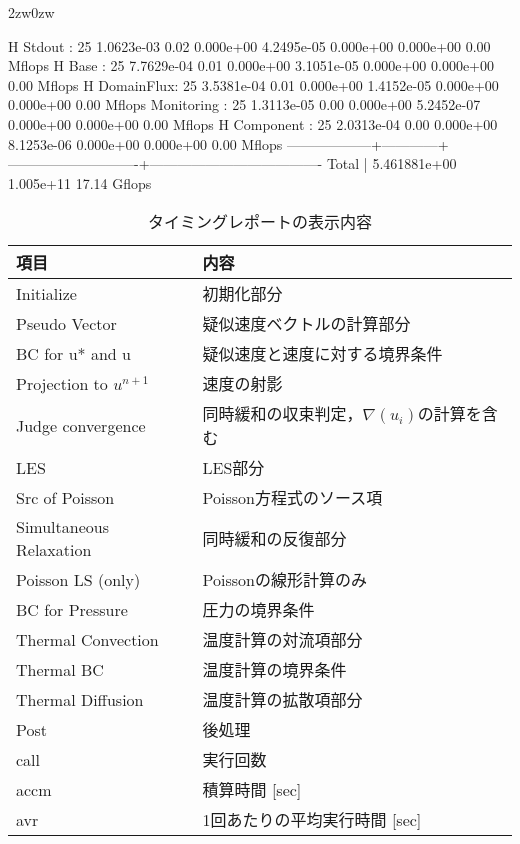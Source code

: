 \begin{indentation}{2zw}{0zw}
{\begin{program}
H Stdout    :  25   1.0623e-03   0.02  0.000e+00  4.2495e-05   0.000e+00  0.000e+00    0.00 Mflops
H Base      :  25   7.7629e-04   0.01  0.000e+00  3.1051e-05   0.000e+00  0.000e+00    0.00 Mflops
H DomainFlux:  25   3.5381e-04   0.01  0.000e+00  1.4152e-05   0.000e+00  0.000e+00    0.00 Mflops
Monitoring  :  25   1.3113e-05   0.00  0.000e+00  5.2452e-07   0.000e+00  0.000e+00    0.00 Mflops
H Component :  25   2.0313e-04   0.00  0.000e+00  8.1253e-06   0.000e+00  0.000e+00    0.00 Mflops
------------------+------------+----------------------------+-------------------------------------
Total       |                5.461881e+00                      1.005e+11              17.14 Gflops
\end{program}
}

\begin{table}[htdp]
\caption{タイミングレポートの表示内容}
\begin{center}
\small
\begin{tabular}{ll}\toprule
項目 & 内容\\ \midrule
Initialize              & 初期化部分\\
Pseudo Vector           & 疑似速度ベクトルの計算部分\\
BC for u* and u         & 疑似速度と速度に対する境界条件\\
Projection to $u^{n+1}$ & 速度の射影\\
Judge convergence       & 同時緩和の収束判定，$\nabla (u_i)$の計算を含む\\
LES                     & LES部分\\
Src of Poisson          & Poisson方程式のソース項\\
Simultaneous Relaxation & 同時緩和の反復部分\\
Poisson LS (only)       & Poissonの線形計算のみ\\
BC for Pressure         & 圧力の境界条件\\
Thermal Convection      & 温度計算の対流項部分\\
Thermal BC              & 温度計算の境界条件\\
Thermal Diffusion       & 温度計算の拡散項部分\\
Post                    & 後処理\\ \midrule
call & 実行回数\\
accm & 積算時間 [sec]\\
avr  & 1回あたりの平均実行時間 [sec]\\ \bottomrule

\end{tabular}
\end{center}
\label{tbl:timing_label}
\end{table}

\end{indentation}

